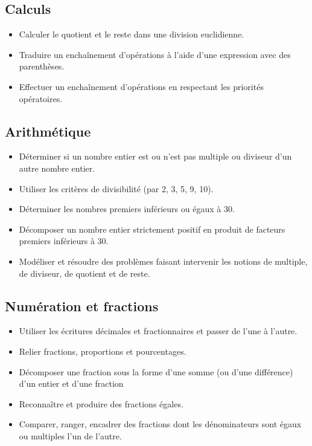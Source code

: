\documentclass[a4paper,12pt,fleqn]{article}
\begin{document}
\renewcommand{\labelitemi}{}

\subsection*{Calculs}

\begin{itemize}
	\item {}	Calculer le quotient et le reste dans une division euclidienne.																								
	\item {}	Traduire un enchaînement d’opérations à l’aide d’une expression avec des parenthèses.																								
	\item {}	Effectuer un enchaînement d’opérations en respectant les priorités opératoires.	
\end{itemize}

\subsection*{Arithmétique}

\begin{itemize}																									
	\item {}	Déterminer si un nombre entier est ou n’est pas multiple ou diviseur d’un autre nombre entier.																								
	\item {}	Utiliser les critères de divisibilité (par 2, 3, 5, 9, 10).																								
	\item {}	Déterminer les nombres premiers inférieurs ou égaux à 30.																								
	\item {}	Décomposer un nombre entier strictement positif en produit de facteurs premiers inférieurs à 30.																								
	\item {}	Modéliser et résoudre des problèmes faisant intervenir les notions de multiple, de diviseur, de quotient et de reste.	
\end{itemize}

\subsection*{Numération et fractions}

\begin{itemize}																									
	\item {}	Utiliser les écritures décimales et fractionnaires et passer de l’une à l’autre.																								
	\item {}	Relier fractions, proportions et pourcentages.																								
	\item {}	Décomposer une fraction sous la forme d’une somme (ou d’une différence) d’un entier et d'une fraction																								
	\item {}	Reconnaître et produire des fractions égales.																								
	\item {}	Comparer, ranger, encadrer des fractions dont les dénominateurs sont égaux ou multiples l’un de l'autre.
\end{itemize}
\end{document}
